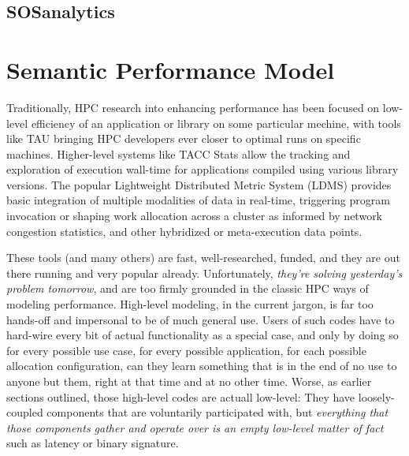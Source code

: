 \subsection{SOSanalytics}






\section{Semantic Performance Model}

Traditionally, HPC research into enhancing performance has been
focused on low-level efficiency of an application or library on some
particular mechine, with tools like TAU bringing HPC developers ever
closer to optimal runs on specific machines.  Higher-level systems
like TACC Stats \cite{evans2014comprehensive} allow the tracking and
exploration of execution wall-time for applications compiled using
various library versions.  The popular Lightweight Distributed Metric
System (LDMS) \cite{agelastos2014lightweight} provides basic
integration of multiple modalities of data in real-time, triggering
program invocation or shaping work allocation across a cluster as
informed by network congestion statistics, and other hybridized or
meta-execution data points.

These tools (and many others) are fast, well-researched, funded, and
they are out there running and very popular already. Unfortunately,
\textit{they're solving yesterday's problem tomorrow}, and are too
firmly grounded in the classic HPC ways of modeling
performance. High-level modeling, in the current jargon, is far too
hands-off and impersonal to be of much general use. Users of such
codes have to hard-wire every bit of actual functionality as a special
case, and only by doing so for every possible use case, for every
possible application, for each possible allocation configuration, can
they learn something that is in the end of no use to anyone but them,
right at that time and at no other time. Worse, as earlier sections
outlined, those high-level codes are actuall low-level: They have
loosely-coupled components that are voluntarily participated with,
but \textit{everything that those components gather and operate over
is an empty low-level matter of fact} such as latency or binary signature.

